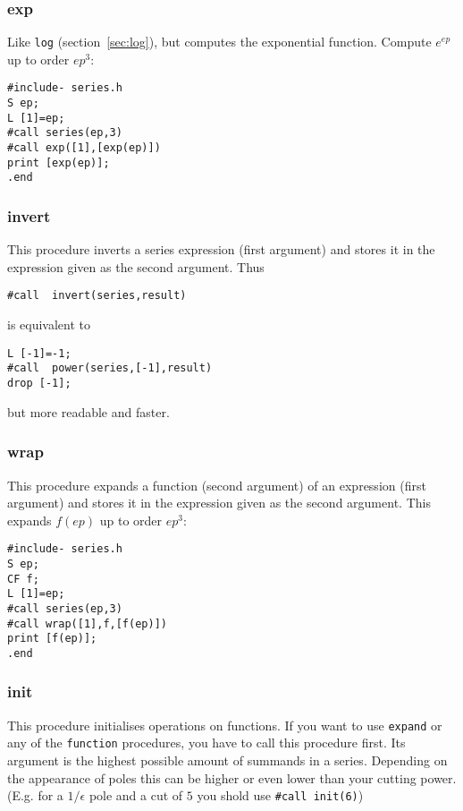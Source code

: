 \documentclass{article}
\begin{document}
\subsubsection{exp}
\label{sec:exp}

Like {\tt log} (section~\ref{sec:log}), but computes the
exponential function. Compute $e^{ep}$ up to order $ep^3$:
\begin{verbatim}
#include- series.h
S ep;
L [1]=ep;
#call series(ep,3)
#call exp([1],[exp(ep)])
print [exp(ep)];
.end
\end{verbatim}


\subsubsection{invert}
\label{sec:invert}

This procedure inverts a series expression (first argument) and stores
it in the expression given as the second argument. Thus
\begin{verbatim}
#call  invert(series,result)
\end{verbatim}
is equivalent to 
\begin{verbatim}
L [-1]=-1;
#call  power(series,[-1],result)
drop [-1];
\end{verbatim}
but more readable and faster.

\subsubsection{wrap}
\label{sec:wrap}

This procedure expands a function (second argument) of an expression
(first argument) 
and stores it in the expression given as the second argument. 
This expands $f(ep)$ up to order $ep^3$:
\begin{verbatim}
#include- series.h
S ep;
CF f;
L [1]=ep;
#call series(ep,3)
#call wrap([1],f,[f(ep)])
print [f(ep)];
.end
\end{verbatim}

\subsubsection{init}
\label{sec:invert}

This procedure initialises operations on functions. If you want to use
{\tt expand} or any of the {\tt *function} procedures, you have to call
this procedure first. Its argument is the highest possible amount of
summands in a series. Depending on the appearance of poles this can be
higher or even lower than your cutting power. (E.g. for a $1/\epsilon$
pole and a cut of $5$ you shold use {\tt \#call init(6)})
\end{document}
